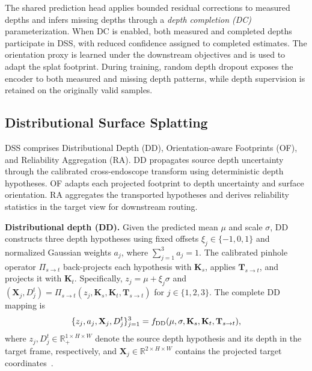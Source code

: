 \documentclass[letterpaper,10pt,conference]{ieeeconf}
\newcommand{\R}{\mathbb{R}}
\newcommand{\K}{\mathbf{K}}
\newcommand{\T}{\mathbf{T}}
\begin{document}
The shared prediction head applies bounded residual corrections to measured
depths and infers missing depths through a \emph{depth completion (DC)}
parameterization. When DC is enabled, both measured and completed depths
participate in DSS, with reduced confidence assigned to completed estimates.
The orientation proxy is learned under the downstream objectives and is used
to adapt the splat footprint. During training, random depth dropout exposes the
encoder to both measured and missing depth patterns, while depth supervision is
retained on the originally valid samples.




\subsection{Distributional Surface Splatting}
\label{sec:dss}
DSS comprises Distributional Depth (DD), Orientation-aware Footprints (OF), and
Reliability Aggregation (RA). DD propagates source depth uncertainty through
the calibrated cross-endoscope transform using deterministic depth hypotheses.
OF adapts each projected footprint to depth uncertainty and surface
orientation. RA aggregates the transported hypotheses and derives reliability
statistics in the target view for downstream routing.

\textbf{Distributional depth (DD).}
Given the predicted mean $\mu$ and scale $\sigma$, DD constructs three depth
hypotheses using fixed offsets $\xi_j\in\{-1,0,1\}$ and normalized Gaussian
weights $a_j$, where $\sum_{j=1}^{3}a_j=1$. The calibrated pinhole operator
$\Pi_{s\rightarrow t}$ back-projects each hypothesis with $\K_s$, applies
$\T_{s\rightarrow t}$, and projects it with $\K_t$. Specifically,
$z_j=\mu+\xi_j\sigma$ and
$(\mathbf X_j,D_j^t)=\Pi_{s\rightarrow t}
(z_j,\K_s,\K_t,\T_{s\rightarrow t})$ for $j\in\{1,2,3\}$.
The complete DD mapping is
\begin{equation}
 \{z_j,a_j,\mathbf X_j,D_j^t\}_{j=1}^{3}
 =f_{\rm DD}(\mu,\sigma,\K_s,\K_t,\T_{s\rightarrow t}),
\label{eq:dd-function}
\end{equation}
where $z_j,D_j^t\in\R_+^{1\times H\times W}$ denote the source depth
hypothesis and its depth in the target frame, respectively, and
$\mathbf X_j\in\R^{2\times H\times W}$ contains
the projected target coordinates~\cite{wiles2020synsin,niklaus2020softmax}.
\end{document}
